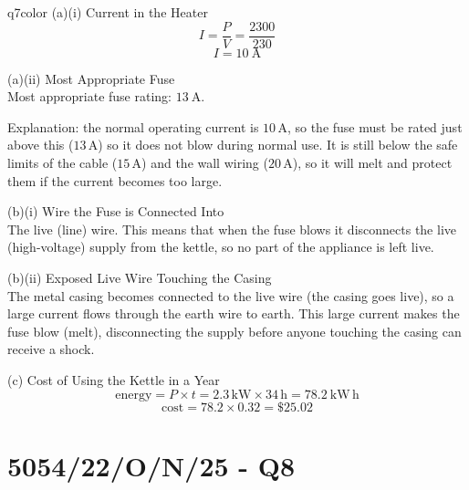 \documentclass[11pt,a4paper]{article}
\newcommand{\qsection}[1]{\needspace{10\baselineskip}\section*{#1}}
\begin{document}
\begin{ansbox}{q7color}
(a)(i) Current in the Heater\\[4pt]
\[
I = \frac{P}{V} = \frac{2300}{230}
\]
\[
I = \boxed{10\ \mathrm{A}}
\]

\vspace{4pt}
(a)(ii) Most Appropriate Fuse\\[4pt]
Most appropriate fuse rating: $\boxed{13\ \mathrm{A}}$.

Explanation: the normal operating current is $10\,\mathrm{A}$, so the fuse must be rated just above this ($13\,\mathrm{A}$) so it does not blow during normal use. It is still below the safe limits of the cable ($15\,\mathrm{A}$) and the wall wiring ($20\,\mathrm{A}$), so it will melt and protect them if the current becomes too large.

\vspace{4pt}
(b)(i) Wire the Fuse is Connected Into\\[4pt]
The live (line) wire. This means that when the fuse blows it disconnects the live (high-voltage) supply from the kettle, so no part of the appliance is left live.

\vspace{4pt}
(b)(ii) Exposed Live Wire Touching the Casing\\[4pt]
The metal casing becomes connected to the live wire (the casing goes live), so a large current flows through the earth wire to earth. This large current makes the fuse blow (melt), disconnecting the supply before anyone touching the casing can receive a shock.

\vspace{4pt}
(c) Cost of Using the Kettle in a Year\\[4pt]
\[
\text{energy} = P \times t = 2.3\,\mathrm{kW} \times 34\,\mathrm{h} = 78.2\ \mathrm{kW\,h}
\]
\[
\text{cost} = 78.2 \times 0.32 = \boxed{\$25.02}
\]
\end{ansbox}

\qsection{5054/22/O/N/25 - Q8}\label{p2_on25:q8}
\end{document}
